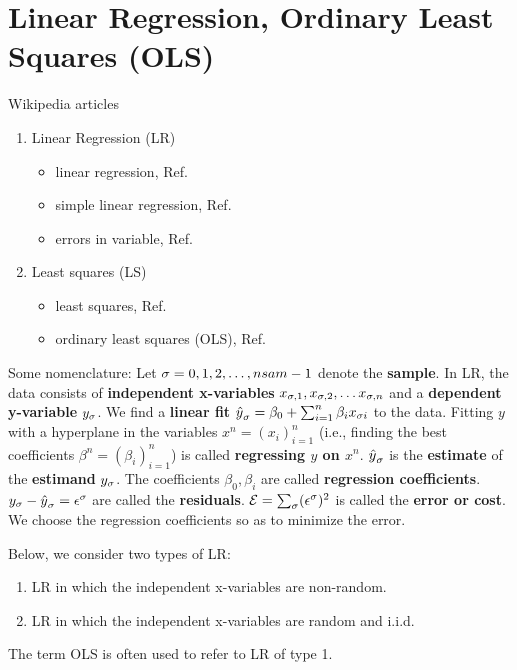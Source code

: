 \chapter{Linear Regression, Ordinary Least Squares (OLS)}
\label{ch-linear-reg}
Wikipedia articles
\begin{enumerate}
\item
Linear Regression (LR)
\begin{itemize}
\item
linear regression, Ref.\cite{wiki-lr}
\item
 simple linear regression, Ref.\cite{wiki-slr}
\item
errors in variable, Ref.\cite{wiki-errors-in-iv}

\end{itemize}
\item
Least squares (LS)
\begin{itemize}
\item
least squares, Ref.\cite{wiki-lsquares}
\item
ordinary least squares (OLS), Ref.\cite{wiki-ols}
\end{itemize}
\end{enumerate}


Some nomenclature: Let $\sigma=0, 1, 2,\ldots, nsam-1$ denote the {\bf sample}. In LR, the
data consists of
{\bf independent x-variables} $x_{\sigma,1},
 x_{\sigma,2}, \ldots x_{\sigma,n}$
and a {\bf dependent y-variable} $y_\sigma$.
We find a {\bf linear fit} ${\hat{y}}_\sigma =
\beta_0 + \sum_{i=1}^n \beta_i x_{\sigma i}$
to the data.
Fitting $y$
with a hyperplane
in the variables $x^n=(x_i)_{i=1}^n$
(i.e., finding
the best coefficients $\beta^n=(\beta_i)_{i=1}^n$)
is called {\bf regressing $y$ on $x^n$}.
${\hat{y}}_\sigma$ is the {\bf estimate}
of the {\bf estimand} $y_\sigma$.
 The coefficients $\beta_0, \beta_i$
are called {\bf regression coefficients}.
$y_\sigma-{\hat{y}}_\sigma=\epsilon^\sigma$
are called  the {\bf residuals}.
${\cal E} =\sum_\sigma (\epsilon^\sigma)^2$
is called the {\bf error or cost}. We choose the
regression coefficients
so as to minimize the error.


Below, we consider two types of LR:

\begin{enumerate}
\item
LR
in which the independent x-variables are non-random.
\item
LR
in which the independent x-variables are random
and i.i.d.
\end{enumerate}

The  term OLS
is often used to refer to LR
of type 1.




